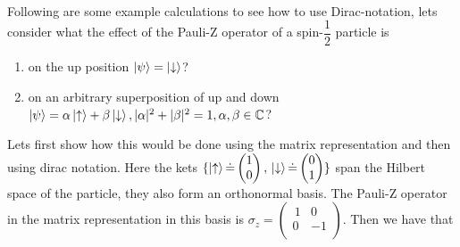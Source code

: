\\
Following are some example calculations to see how to use Dirac-notation, lets consider what the effect of the Pauli-Z operator of a spin-$\dfrac{1}{2}$ particle is
\begin{enumerate}[label=\textbf{\alph*)}]
\item on the up position $\ket{\psi} = \ket{\downarrow}$?

\item on an arbitrary superposition of up and down $\ket{\psi} = \alpha \ket{\uparrow} + \beta\ket{\downarrow}, |\alpha|^2 + |\beta|^2 = 1, \alpha,\beta \in \mathbb{C}$?
\end{enumerate}
Lets first show how this would be done using the matrix representation and then using dirac notation.
Here the kets $\{\ket{\uparrow} \dot{=} \begin{pmatrix}
1 \\ 0
\end{pmatrix}, \, \ket{\downarrow} \dot{=} \begin{pmatrix}
0 \\ 1
\end{pmatrix} \}$ span the Hilbert space of the particle, they also form an orthonormal basis. The Pauli-Z operator in the matrix representation in this basis is $\sigma_z = \begin{pmatrix}
\,1 & 0 \\
0 & -1 \\
\end{pmatrix}$. Then we have that 

